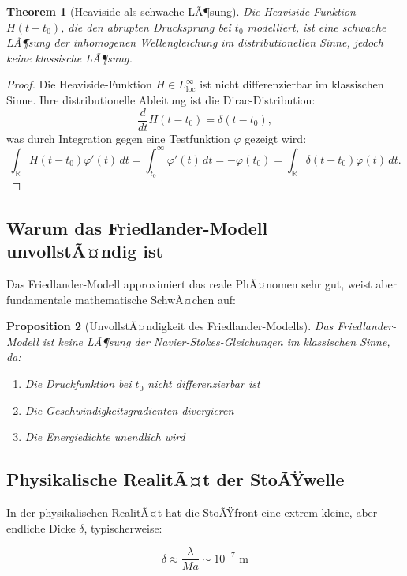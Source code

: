 ﻿\documentclass[12pt,a4paper]{article}
\newtheorem{theorem}{Theorem}[section]
\newtheorem{proposition}[theorem]{Proposition}
\theoremstyle{definition}
\theoremstyle{remark}
\begin{document}
\begin{theorem}[Heaviside als schwache LÃ¶sung]
\label{thm:heaviside_schwach}
Die Heaviside-Funktion $H(t-t_0)$, die den abrupten Drucksprung bei $t_0$ modelliert, ist eine schwache LÃ¶sung der inhomogenen Wellengleichung im distributionellen Sinne, jedoch keine klassische LÃ¶sung.
\end{theorem}
\begin{proof}
Die Heaviside-Funktion $H \in L^\infty_{\text{loc}}$ ist nicht differenzierbar im klassischen Sinne. Ihre distributionelle Ableitung ist die Dirac-Distribution:
\[
\frac{d}{dt}H(t-t_0) = \delta(t-t_0),
\]
was durch Integration gegen eine Testfunktion $\varphi$ gezeigt wird:
\[
\int_\mathbb{R} H(t-t_0)\varphi'(t)\,dt = \int_{t_0}^\infty \varphi'(t)\,dt = -\varphi(t_0) = \int_\mathbb{R} \delta(t-t_0)\varphi(t)\,dt. 
\]
\end{proof}

\subsection{Warum das Friedlander-Modell unvollstÃ¤ndig ist}

Das Friedlander-Modell approximiert das reale PhÃ¤nomen sehr gut, weist aber fundamentale mathematische SchwÃ¤chen auf:

\begin{proposition}[UnvollstÃ¤ndigkeit des Friedlander-Modells]
Das Friedlander-Modell ist keine LÃ¶sung der Navier-Stokes-Gleichungen im klassischen Sinne, da:
\begin{enumerate}
\item Die Druckfunktion bei $t_0$ nicht differenzierbar ist
\item Die Geschwindigkeitsgradienten divergieren
\item Die Energiedichte unendlich wird
\end{enumerate}
\end{proposition}

\subsection{Physikalische RealitÃ¤t der StoÃŸwelle}

In der physikalischen RealitÃ¤t hat die StoÃŸfront eine extrem kleine, aber endliche Dicke $\delta$, typischerweise:

\begin{equation}
\delta \approx \frac{\lambda}{Ma} \sim 10^{-7} \text{ m}
\end{equation}
\end{document}
